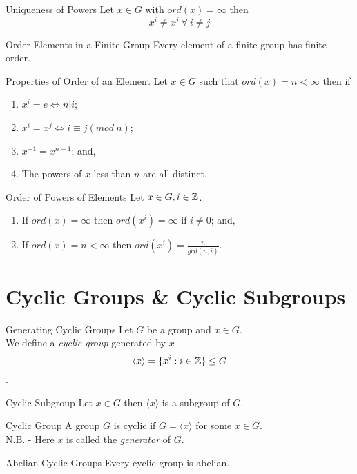 \documentclass[11pt,a4paper]{article}
\begin{document}
\subtitle{Proposition 6.02 - }{Uniqueness of Powers}
Let $x \in G$ with $ord(x) = \infty$ then $$x^i \not = x^j\ \forall\ i \not = j$$

\subtitle{Theorem 6.03 - }{Order Elements in a Finite Group}
Every element of a finite group has finite order.\\

\subtitle{Theorem 6.04 - }{Properties of Order of an Element}
Let $x \in G$ such that $ord(x) = n < \infty$ then if
\begin{enumerate}[label=\roman*)]
  \item $x^i = e \iff n | i$;
  \item $x^i = x^j \iff i \equiv j (mod\ n)$;
  \item $x^{-1} = x^{n-1}$; and,
  \item The powers of $x$ less than $n$ are all distinct.
\end{enumerate}

\subtitle{Proposition 6.05 - }{Order of Powers of Elements}
Let $x \in G, i \in \mathbb{Z}$.
\begin{enumerate}[label=\roman*)]
  \item If $ord(x) = \infty$ then $ord(x^i) = \infty$ if $i \not = 0$; and,
  \item If $ord(x) = n < \infty$ then $\displaystyle{ord(x^i) = \frac{n}{gcd(n,i)}}$.
\end{enumerate}

\section{Cyclic Groups \& Cyclic Subgroups}

\subtitle{Definition 7.01 - }{Generating Cyclic Groups}
Let $G$ be a group and $x \in G$.\\
We define a \textit{cyclic group} generated by $x$ $$\langle x \rangle = \{x^i : i \in \mathbb{Z} \} \leq G$$.

\subtitle{Theorem 7.02 - }{Cyclic Subgroup}
Let $x \in G$ then $\langle x \rangle$ is a subgroup of $G$.\\

\subtitle{Definition 7.03 - }{Cyclic Group}
A group $G$ is cyclic if $G = \langle x \rangle$ for some $x \in G$.\\
\underline{N.B.} - Here $x$ is called the \textit{generator} of $G$.\\

\subtitle{Theorem 7.04 - }{Abelian Cyclic Groups}
Every cyclic group is abelian.\\
\end{document}
